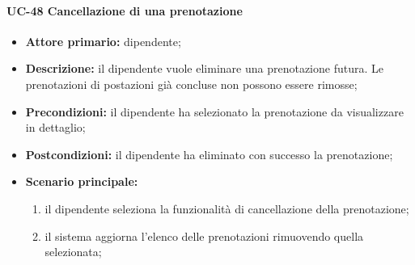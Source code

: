 \paragraph{UC-48 Cancellazione di una prenotazione}

    \begin{itemize}
        \item \textbf{Attore primario:} dipendente;

        \item \textbf{Descrizione:} il dipendente vuole eliminare una prenotazione futura. Le prenotazioni di postazioni già concluse non possono essere rimosse;

        \item \textbf{Precondizioni:} il dipendente ha selezionato la prenotazione da visualizzare in dettaglio;

        \item \textbf{Postcondizioni:} il dipendente ha eliminato con successo la prenotazione;

        \item \textbf{Scenario principale:}
            \begin{enumerate}
                \item il dipendente seleziona la funzionalità di cancellazione della prenotazione;
                \item il sistema aggiorna l'elenco delle prenotazioni rimuovendo quella selezionata;
            \end{enumerate}
    \end{itemize} 

